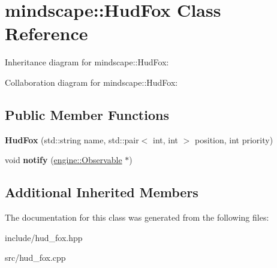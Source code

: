 \hypertarget{classmindscape_1_1_hud_fox}{}\section{mindscape\+:\+:Hud\+Fox Class Reference}
\label{classmindscape_1_1_hud_fox}


Inheritance diagram for mindscape\+:\+:Hud\+Fox\+:


Collaboration diagram for mindscape\+:\+:Hud\+Fox\+:
\subsection*{Public Member Functions}
\begin{DoxyCompactItemize}
\item 
{\bfseries Hud\+Fox} (std\+::string name, std\+::pair$<$ int, int $>$ position, int priority)\hypertarget{classmindscape_1_1_hud_fox_affa10d22e2ffd68fb505630ff7f0bd5f}{}\label{classmindscape_1_1_hud_fox_affa10d22e2ffd68fb505630ff7f0bd5f}

\item 
void {\bfseries notify} (\hyperlink{classengine_1_1_observable}{engine\+::\+Observable} $\ast$)\hypertarget{classmindscape_1_1_hud_fox_af2076f6d6287cbab6305f09432512e93}{}\label{classmindscape_1_1_hud_fox_af2076f6d6287cbab6305f09432512e93}

\end{DoxyCompactItemize}
\subsection*{Additional Inherited Members}


The documentation for this class was generated from the following files\+:\begin{DoxyCompactItemize}
\item 
include/hud\+\_\+fox.\+hpp\item 
src/hud\+\_\+fox.\+cpp\end{DoxyCompactItemize}

